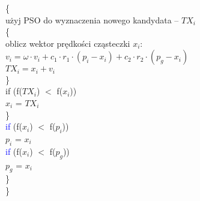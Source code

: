 \documentclass{article}
\begin{document}
{\indent\indent		\{\\
\indent\indent\indent			użyj PSO do wyznaczenia nowego kandydata – $TX_i$\\
\indent\indent\indent			\{\\
\indent\indent\indent\indent				oblicz wektor prędkości cząsteczki $x_i$:\\
\indent\indent\indent\indent				$v_i = \omega \cdot v_i + c_1 \cdot r_1 \cdot (p_i - x_i) + c_2 \cdot r_2 \cdot (p_g - x_i)$\\
\indent\indent\indent\indent				$TX_i = x_i + v_i$\\
\indent\indent\indent			\}\\
\indent\indent\indent			if (f($TX_i$) $<$ f($x_i$))\\
\indent\indent\indent\indent				$x_i$ = $TX_i$\\
\indent\indent	\}\\
\indent\indent		\textcolor{blue}{if} (f($x_i$) $<$ f($p_i$))\\
\indent\indent\indent			$p_i$ = $x_i$\\
\indent\indent		\textcolor{blue}{if} (f($x_i$) $<$ f($p_g$))\\
\indent\indent\indent			$p_g$ = $x_i$\\
\indent	\}\\
\}
}
\end{document}
